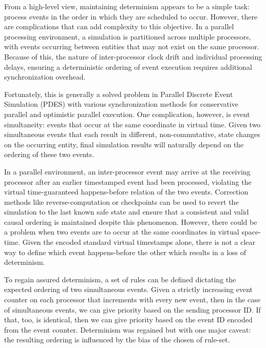 \documentclass[nonacm,sigconf]{acmart}
\begin{document}
From a high-level view, maintaining determinism appears to be a simple task: process events in the order in which they are scheduled to occur. However, there are complications that can add complexity to this objective. In a parallel processing environment, a simulation is partitioned across multiple processors, with events occurring between entities that may not exist on the same processor. Because of this, the nature of inter-processor clock drift and individual processing delays, ensuring a deterministic ordering of event execution requires additional synchronization overhead.

Fortunately, this is generally a solved problem in Parallel Discrete Event Simulation (PDES) with various synchronization methods for conservative parallel and optimistic parallel execution. One complication, however, is event simultaneity: events that occur at the same coordinate in virtual time. Given two simultaneous events that each result in different, non-commutative, state changes on the occurring entity, final simulation results will naturally depend on the ordering of these two events. 

In a parallel environment, an inter-processor event may arrive at the receiving processor after an earlier timestamped event had been processed, violating the virtual time-guaranteed happens-before relation of the two events. Correction methods like reverse-computation or checkpoints can be used to revert the simulation to the last known safe state and ensure that a consistent and valid causal ordering is maintained despite this phenomenon. However, there could be a problem when two events are to occur at the same coordinates in virtual space-time. Given the encoded standard virtual timestamps alone, there is not a clear way to define which event happens-before the other which results in a loss of determinism.

To regain assured determinism, a set of rules can be defined dictating the expected ordering of two simultaneous events. Given a strictly increasing event counter on each processor that increments with every new event, then in the case of simultaneous events, we can give priority based on the sending processor ID. If that, too, is identical, then we can give priority based on the event ID encoded from the event counter. Determinism was regained but with one major caveat: the resulting ordering is influenced by the bias of the chosen of rule-set.
\end{document}
